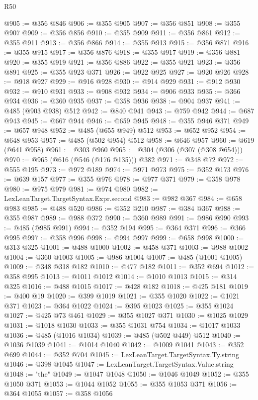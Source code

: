\begin{lexlean}{R50}
\begin{coremodule}
@905 := @356 @846
@906 := @355 @905
@907 := @356 @851
@908 := @355 @907
@909 := @356 @856
@910 := @355 @909
@911 := @356 @861
@912 := @355 @911
@913 := @356 @866
@914 := @355 @913
@915 := @356 @871
@916 := @355 @915
@917 := @356 @876
@918 := @355 @917
@919 := @356 @881
@920 := @355 @919
@921 := @356 @886
@922 := @355 @921
@923 := @356 @891
@925 := @355 @923 @371
@926 := @922 @925
@927 := @920 @926
@928 := @918 @927
@929 := @916 @928
@930 := @914 @929
@931 := @912 @930
@932 := @910 @931
@933 := @908 @932
@934 := @906 @933
@935 := @366 @934
@936 := @360 @935
@937 := @358 @936
@938 := @904 @937
@941 := @485 (@903 @938) @512
@942 := @840 @941
@943 := @759 @942
@944 := @687 @943
@945 := @667 @944
@946 := @659 @945
@948 := @355 @946 @371
@949 := @657 @948
@952 := @485 (@655 @949) @512
@953 := @652 @952
@954 := @648 @953
@957 := @485 (@502 @954) @512
@958 := @646 @957
@960 := @619 (@641 @958)
@961 := @303 @960
@965 := @304 (@306 (@307 (@308 @654)))
@970 := @965 (@616 (@546 (@176 @135))) @382
@971 := @348 @72
@972 := @555 @195
@973 := @972 @189
@974 := @971 @973
@975 := @352 @173
@976 := @639 @157
@977 := @355 @976
@978 := @977 @371
@979 := @358 @978
@980 := @975 @979
@981 := @974 @980
@982 := LexLeanTarget.TargetSyntax.Expr.second
@983 := @982 @367
@984 := @658 @983
@985 := @488 @520
@986 := @352 @210
@987 := @384 @367
@988 := @355 @987
@989 := @988 @372
@990 := @360 @989
@991 := @986 @990
@993 := @485 (@985 @991)
@994 := @352 @194
@995 := @364 @371
@996 := @366 @995
@997 := @358 @996
@998 := @994 @997
@999 := @658 @998
@1000 := @313 @325
@1001 := @488 @1000
@1002 := @458 @371
@1003 := @988 @1002
@1004 := @360 @1003
@1005 := @986 @1004
@1007 := @485 (@1001 @1005)
@1009 := @348 @318 @182
@1010 := @477 @182
@1011 := @352 @694
@1012 := @358 @995
@1013 := @1011 @1012
@1014 := @1010 @1013
@1015 := @314 @325
@1016 := @488 @1015
@1017 := @428 @182
@1018 := @425 @181
@1019 := @400 @19
@1020 := @399 @1019
@1021 := @355 @1020
@1022 := @1021 @371
@1023 := @364 @1022
@1024 := @395 @1023
@1025 := @355 @1024
@1027 := @425 @73 @461
@1029 := @355 @1027 @371
@1030 := @1025 @1029
@1031 := @1018 @1030
@1033 := @355 @1031 @754
@1034 := @1017 @1033
@1036 := @485 (@1016 @1034)
@1039 := @485 (@502 @449) @512
@1040 := @1036 @1039
@1041 := @1014 @1040
@1042 := @1009 @1041
@1043 := @352 @699
@1044 := @352 @704
@1045 := LexLeanTarget.TargetSyntax.Ty.string
@1046 := @398 @1045
@1047 := LexLeanTarget.TargetSyntax.Value.string
@1048 := "the"
@1049 := @1047 @1048
@1050 := @1046 @1049
@1052 := @355 @1050 @371
@1053 := @1044 @1052
@1055 := @355 @1053 @371
@1056 := @364 @1055
@1057 := @358 @1056

\end{coremodule}
\end{lexlean}
